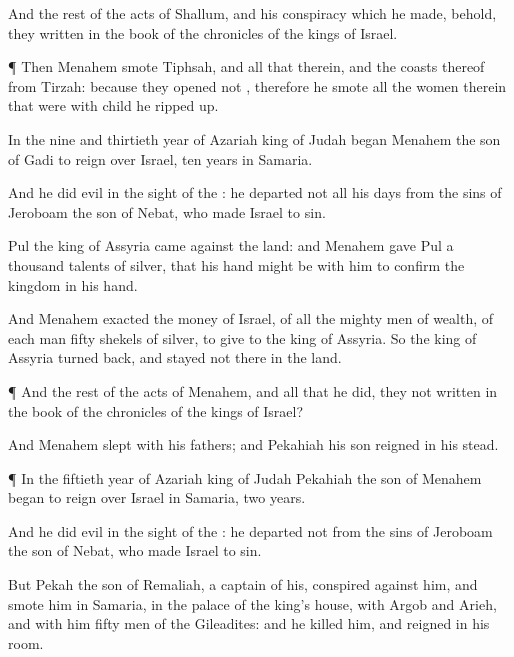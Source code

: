 {And the
rest of the
acts of
Shallum, and his
conspiracy which he
made, behold, they
{}
written in the
book of the
chronicles of the
kings of
Israel.


\par }{\PP {}¶ Then
Menahem
smote
Tiphsah, and all that
{} therein, and the
coasts thereof from
Tirzah: because they
opened not
{}, therefore he
smote
{} all the women therein that were with
child he ripped
up.

In the
nine and
thirtieth
year of
Azariah
king of
Judah began
Menahem the
son of
Gadi to
reign over
Israel,
{}
ten
years in
Samaria.

And he
did
{}
evil in the
sight of the
{}: he
departed not all his
days from the
sins of
Jeroboam the
son of
Nebat, who made
Israel to
sin.

Pul the
king of
Assyria
came against the
land: and
Menahem
gave
Pul a
thousand
talents of
silver, that his
hand might be with him to
confirm the
kingdom in his
hand.

And
Menahem
exacted the
money of
Israel,
{} of all the mighty
men of
wealth, of
each
man
fifty
shekels of
silver, to
give to the
king of
Assyria. So the
king of
Assyria turned
back, and
stayed not there in the
land.


\par }{\PP {}¶ And the
rest of the
acts of
Menahem, and all that he
did,
{} they not
written in the
book of the
chronicles of the
kings of
Israel?

And
Menahem
slept with his
fathers; and
Pekahiah his
son
reigned in his stead.


\par }{\PP {}¶ In the
fiftieth
year of
Azariah
king of
Judah
Pekahiah the
son of
Menahem began to
reign over
Israel in
Samaria,
{} two
years.

And he
did
{}
evil in the
sight of the
{}: he
departed not from the
sins of
Jeroboam the
son of
Nebat, who made
Israel to
sin.

But
Pekah the
son of
Remaliah, a
captain of his,
conspired against him, and
smote him in
Samaria, in the
palace of the
king’s
house, with
Argob and
Arieh, and with him
fifty
men of the
Gileadites: and he
killed him, and
reigned in his room.

}
